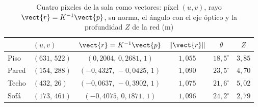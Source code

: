 \begin{table}[htbp]
\caption{Cuatro píxeles de la sala como vectores: píxel $(u,v)$, rayo $\vect{r}=K^{-1}\vect{p}$, su norma, el ángulo con el eje óptico y la profundidad $Z$ de la red (m)}
\label{tab:hab-rayos}
\centering\small
\begin{tabular}{@{}llcccc@{}}
\toprule
 & $(u,v)$ & $\vect{r}=K^{-1}\vect{p}$ & $\lVert\vect{r}\rVert$ & $\theta$ & $Z$ \\
\midrule
Piso & $(631,\,522)$ & $(0{,}2004,\,0{,}2681,\,1)$ & $1{,}055$ & $18{,}5^\circ$ & $3{,}85$ \\
Pared & $(154,\,288)$ & $(-0{,}4327,\,-0{,}0425,\,1)$ & $1{,}090$ & $23{,}5^\circ$ & $4{,}70$ \\
Techo & $(432,\,26)$ & $(-0{,}0637,\,-0{,}3902,\,1)$ & $1{,}075$ & $21{,}6^\circ$ & $5{,}02$ \\
Sofá & $(173,\,461)$ & $(-0{,}4075,\,0{,}1871,\,1)$ & $1{,}096$ & $24{,}2^\circ$ & $2{,}79$ \\
\bottomrule
\end{tabular}
\end{table}

